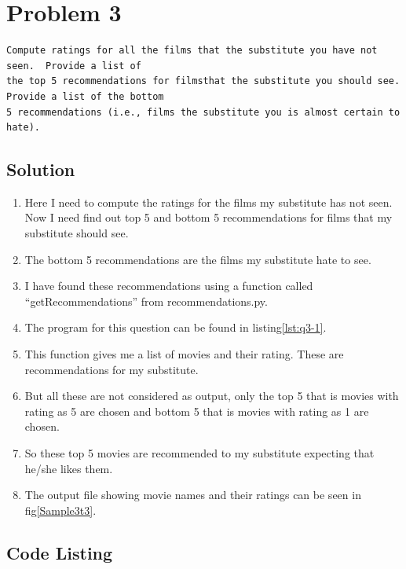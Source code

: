 \section{Problem 3}
\label{part3}
\begin{verbatim}
Compute ratings for all the films that the substitute you have not seen.  Provide a list of
the top 5 recommendations for filmsthat the substitute you should see.  Provide a list of the bottom
5 recommendations (i.e., films the substitute you is almost certain to hate).
\end{verbatim}
\subsection{Solution}
\begin{enumerate}

\item Here I need to compute the ratings for the films my substitute has not seen. Now I need find out top 5 and bottom 5 recommendations for films that my substitute should see.
\item The bottom 5 recommendations are the films my substitute hate to see.
\item I have found these recommendations using a function called ``getRecommendations'' from recommendations.py.
\item The program for this question can be found in listing\ref{lst:q3-1}.
\item This function gives me a list of movies and their rating. These are recommendations for my substitute.
\item But all these are not considered as output, only the top 5 that is movies with rating as 5 are chosen and bottom 5 that is movies with rating  as 1 are chosen.
\item So these top 5 movies are recommended to my substitute expecting that he/she likes them.
\item The output file showing movie names and their ratings can be seen in fig\ref{Sample3t3}.

\newpage
\end{enumerate}
\subsection{Code Listing}


\newpage

